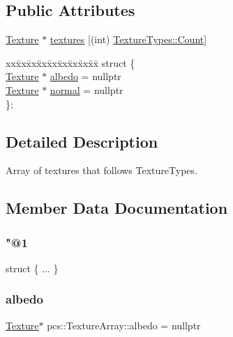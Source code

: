\subsection*{Public Attributes}
\begin{DoxyCompactItemize}
\item 
\hyperlink{classpcs_1_1Texture}{Texture} $\ast$ \hyperlink{unionpcs_1_1TextureArray_a04e4947ed39b82bc46eb4c5be4a5c361}{textures} \mbox{[}(int) \hyperlink{namespacepcs_a2f6dfe5fadf3611302a9b7259502c3c9ae93f994f01c537c4e2f7d8528c3eb5e9}{Texture\+Types\+::\+Count}\mbox{]}
\item 
\begin{tabbing}
xx\=xx\=xx\=xx\=xx\=xx\=xx\=xx\=xx\=\kill
struct \{\\
\>\hyperlink{classpcs_1_1Texture}{Texture} $\ast$ \hyperlink{unionpcs_1_1TextureArray_ad2b4ebb3221d461406db106b1f186d1f}{albedo} = nullptr\\
\>\hyperlink{classpcs_1_1Texture}{Texture} $\ast$ \hyperlink{unionpcs_1_1TextureArray_a70257f556ecd88b438daa286d5b2d3ce}{normal} = nullptr\\
\}; \\

\end{tabbing}\end{DoxyCompactItemize}


\subsection{Detailed Description}
Array of textures that follows Texture\+Types. 

\subsection{Member Data Documentation}
\mbox{\label{unionpcs_1_1TextureArray_ade823ca99be07a8759437430d9318235}} 
\subsubsection{\texorpdfstring{"@1}{@1}}
{\footnotesize\ttfamily struct \{ ... \} }

\mbox{\label{unionpcs_1_1TextureArray_ad2b4ebb3221d461406db106b1f186d1f}} 
\subsubsection{\texorpdfstring{albedo}{albedo}}
{\footnotesize\ttfamily \hyperlink{classpcs_1_1Texture}{Texture}$\ast$ pcs\+::\+Texture\+Array\+::albedo = nullptr}

